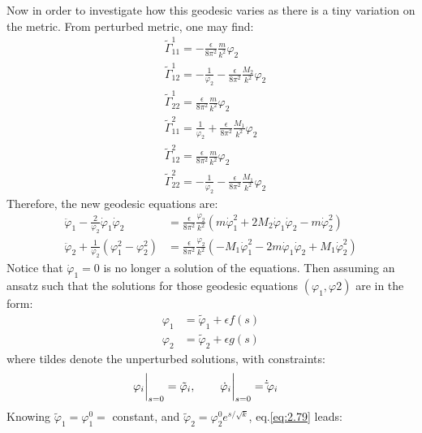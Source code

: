 Now in order to investigate how this geodesic varies as there is a tiny variation on the metric. From perturbed metric, one may find:
\begin{align}
    &\tilde \Gamma_{11}^{1} = -\frac{\epsilon}{8\pi^{2}} \frac{m}{k^2}\varphi_{2} \\
    &\tilde \Gamma _{12} ^{1} = -\frac{1}{\varphi_{2}} -\frac{\epsilon}{8\pi^{2}}\frac{M_2}{k^2}\varphi_{2} \\
    &\tilde \Gamma _{22}^{1} = \frac{\epsilon}{8\pi^{2}} \frac{m}{k^2} \varphi_{2} \\
    &\tilde \Gamma _{11} ^{2} = \frac{1}{\varphi_{2}} + \frac{\epsilon}{8\pi^{2}}\frac{M_{1}}{k^{2}}\varphi_{2}\\
    &\tilde \Gamma _{12} ^{2} = \frac{\epsilon}{8\pi ^{2}} \frac{m}{k^{2}}\varphi_{2} \\
    &\tilde \Gamma _{22} ^{2} = -\frac{1}{\varphi_{2}} -\frac{\epsilon}{8\pi^{2}}\frac{M_1}{k^{2}}\varphi_{2}
\end{align}
Therefore, the new geodesic equations are:
\begin{align}[left=\empheqlbrace]
    \label{eq:2.79}
    \ddot \varphi_{1} - \frac{2}{\varphi_{2}} \dot \varphi_{1} \dot \varphi_{2} &= \frac{\epsilon}{8\pi ^{2}} \frac{\varphi_{2}}{k^{2}} (m\dot\varphi_{1}^{2} + 2M_{2} \dot \varphi_{1} \dot \varphi_{2} - m\dot \varphi_{2}^{2} )\\
    \label{eq:2.80}
    \ddot \varphi_{2} +\frac{1}{\varphi_{2}} (\varphi_{1} ^{2} - \varphi_{2}^{2}) &= \frac{\epsilon}{8\pi ^{2}}\frac{\varphi_{2}}{k^{2}}(-M_{1} \dot \varphi_{1}^{2} - 2m \dot \varphi_{1} \dot \varphi_{2} + M_{1} \dot \varphi_{2} ^{2})
\end{align}
Notice that $\dot \varphi_{1} = 0$ is no longer a solution of the equations. Then assuming an ansatz such that the solutions for those geodesic equations $(\varphi_{1}, \varphi{2})$ are in the form:
\begin{align}[left=\empheqlbrace]
    \varphi_{1} &= \tilde \varphi_{1} + \epsilon f(s) \\
    \varphi_{2} &= \tilde \varphi_{2} + \epsilon g(s) 
\end{align}
where tildes denote the unperturbed solutions, with constraints:
\begin{align}
    \eval{\varphi_{i} } _{s=0} = \tilde \varphi_{i} ,& \qq{} \eval{\dot \varphi_{i}} _{s=0} = \dot \tilde\varphi_{i} 
\end{align}
Knowing $\tilde \varphi_{1} = \varphi_{1}^{0} =$ constant, and $\tilde \varphi_{2} = \varphi_{2} ^{0} e^{s/\sqrt{k}}$, eq.\ref{eq:2.79} leads:
